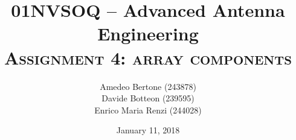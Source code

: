\documentclass[11pt,a4paper,twoside,openright]{article}
\title{	01NVSOQ -- Advanced Antenna Engineering \\
	\huge {\textsc{Assignment 4: array components}}	}
\begin{document}
\author{Amedeo Bertone (243878)\\Davide Botteon (239595)\\Enrico Maria Renzi (244028)\\
}
\date{January 11, 2018}
\maketitle 		
\tableofcontents





\end{document}
